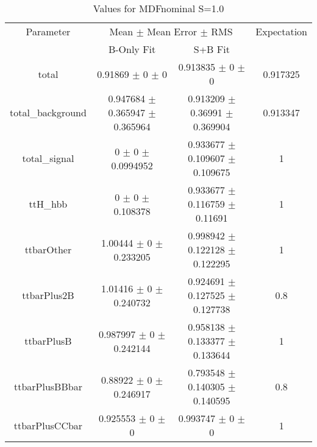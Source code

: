 \begin{table}
\centering
\caption{Values for MDFnominal S=1.0}
\begin{tabular}{cccc}
\toprule
Parameter & \multicolumn{2}{c}{Mean $\pm$ Mean Error $\pm$ RMS} & Expectation\\
 & B-Only Fit & S+B Fit & \\
\midrule
total & \num{0.91869} $\pm$ \num{0} $\pm$ \num{0} & \num{0.913835} $\pm$ \num{0} $\pm$ \num{0} & \num{0.917325}\\
total\_background & \num{0.947684} $\pm$ \num{0.365947} $\pm$ \num{0.365964} & \num{0.913209} $\pm$ \num{0.36991} $\pm$ \num{0.369904} & \num{0.913347}\\
total\_signal & \num{0} $\pm$ \num{0} $\pm$ \num{0.0994952} & \num{0.933677} $\pm$ \num{0.109607} $\pm$ \num{0.109675} & \num{1}\\
ttH\_hbb & \num{0} $\pm$ \num{0} $\pm$ \num{0.108378} & \num{0.933677} $\pm$ \num{0.116759} $\pm$ \num{0.11691} & \num{1}\\
ttbarOther & \num{1.00444} $\pm$ \num{0} $\pm$ \num{0.233205} & \num{0.998942} $\pm$ \num{0.122128} $\pm$ \num{0.122295} & \num{1}\\
ttbarPlus2B & \num{1.01416} $\pm$ \num{0} $\pm$ \num{0.240732} & \num{0.924691} $\pm$ \num{0.127525} $\pm$ \num{0.127738} & \num{0.8}\\
ttbarPlusB & \num{0.987997} $\pm$ \num{0} $\pm$ \num{0.242144} & \num{0.958138} $\pm$ \num{0.133377} $\pm$ \num{0.133644} & \num{1}\\
ttbarPlusBBbar & \num{0.88922} $\pm$ \num{0} $\pm$ \num{0.246917} & \num{0.793548} $\pm$ \num{0.140305} $\pm$ \num{0.140595} & \num{0.8}\\
ttbarPlusCCbar & \num{0.925553} $\pm$ \num{0} $\pm$ \num{0} & \num{0.993747} $\pm$ \num{0} $\pm$ \num{0} & \num{1}\\
\bottomrule
\end{tabular}
\end{table}
